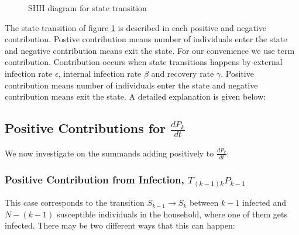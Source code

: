 \documentclass[paper=a4, fontsize=11pt, twoside, BCOR=12mm, parskip=full, listof=totoc]{scrreprt}
\begin{document}
\begin{figure}[H]
\centering
{}
\caption{SHH diagram for state transition}
\label{SHH state transition diagram}
\end{figure}
  
The state transition of figure \ref{SHH state transition diagram} is described in each positive and negative contribution. Postive contribution means number of individuals enter the state and negative contribution means exit the state. For our convenience we use term contribution. Contribution occurs when state transitions happens by external infection rate $\epsilon$, internal infection rate $\beta$ and recovery rate $\gamma$. Positive contribution means number of individuals enter the state and negative contribution means exit the state. A detailed explanation is given below:  

\subsection*{Positive Contributions for $\frac{dP_k}{dt}$}
We now investigate on the summands adding positively to $\frac{dP_k}{dt}$:
	
\subsubsection*{Positive Contribution from Infection, $T_{(k-1)k}P_{k-1}$ }
 	This case corresponds to the transition $S_{k-1}\rightarrow S_{k}$ between $k-1$ infected and $N-(k-1)$ susceptible individuals in the household, where one of them gets infected.
There may be two different ways that this can happen:
\end{document}
